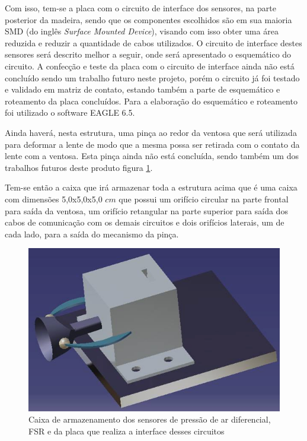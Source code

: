 Com isso, tem-se a placa com o circuito de interface dos sensores, na parte posterior da madeira, sendo que os componentes escolhidos são em sua maioria SMD (do inglês \textit{Surface Mounted Device}), visando com isso obter uma área reduzida e reduzir a quantidade de cabos utilizados. O circuito de interface destes sensores será descrito melhor a seguir, onde será apresentado o esquemático do circuito. A confecção e teste da placa com o circuito de interface ainda não está concluído sendo um trabalho futuro neste projeto, porém o circuito já foi testado e validado em matriz de contato, estando também a parte de esquemático e roteamento da placa concluídos. Para a elaboração do esquemático e roteamento foi utilizado o software EAGLE 6.5.
	
Ainda haverá, nesta estrutura, uma pinça ao redor da ventosa que será utilizada para deformar a lente de modo que a mesma possa ser retirada com o contato da lente com a ventosa. Esta pinça ainda não está concluída, sendo também um dos trabalhos futuros deste produto figura \ref{caixa}.

Tem-se então a caixa que irá armazenar toda a estrutura acima que é uma caixa com dimensões 5,0x5,0x5,0 $cm$ que possui um orifício circular na parte frontal para saída da ventosa, um orifício retangular na parte superior para saída dos cabos de comunicação com os demais circuitos e dois orifícios laterais, um de cada lado, para a saída do mecanismo da pinça.

\begin{figure}[H]
		\centering
			\includegraphics[scale=1.0]{figuras/caixa.png}
		\caption{Caixa de armazenamento dos sensores de pressão de ar diferencial, FSR e da placa que realiza a interface desses circuitos}
		\label{caixa}
\end{figure}

